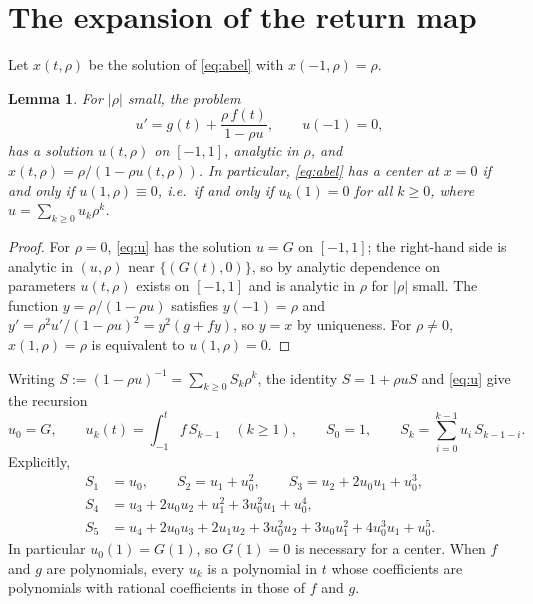 \documentclass[11pt]{amsart}
\numberwithin{equation}{section}
\theoremstyle{plain}
\newtheorem{lemma}[theorem]{Lemma}
\theoremstyle{definition}
\theoremstyle{remark}
\begin{document}
\section{The expansion of the return map}\label{sec:expansion}

Let $x(t,\rho)$ be the solution of \eqref{eq:abel} with $x(-1,\rho)=\rho$.

\begin{lemma}\label{lem:u}
For $|\rho|$ small, the problem
\begin{equation}\label{eq:u}
 u'=g(t)+\frac{\rho\,f(t)}{1-\rho u},\qquad u(-1)=0,
\end{equation}
has a solution $u(t,\rho)$ on $[-1,1]$, analytic in $\rho$, and
$x(t,\rho)=\rho/(1-\rho u(t,\rho))$. In particular, \eqref{eq:abel} has a center
at $x=0$ if and only if $u(1,\rho)\equiv0$, i.e.\ if and only if $u_k(1)=0$ for
all $k\ge0$, where $u=\sum_{k\ge0}u_k\rho^k$.
\end{lemma}

\begin{proof}
For $\rho=0$, \eqref{eq:u} has the solution $u=G$ on $[-1,1]$; the right-hand side
is analytic in $(u,\rho)$ near $\{(G(t),0)\}$, so by analytic dependence on
parameters $u(t,\rho)$ exists on $[-1,1]$ and is analytic in $\rho$ for $|\rho|$
small. The function $y=\rho/(1-\rho u)$ satisfies $y(-1)=\rho$ and
$y'=\rho^2u'/(1-\rho u)^2=y^2(g+fy)$, so $y=x$ by uniqueness. For $\rho\ne0$,
$x(1,\rho)=\rho$ is equivalent to $u(1,\rho)=0$.
\end{proof}

Writing $S:=(1-\rho u)^{-1}=\sum_{k\ge0}S_k\rho^k$, the identity $S=1+\rho uS$ and
\eqref{eq:u} give the recursion
\begin{equation}\label{eq:rec}
 u_0=G,\qquad u_k(t)=\int_{-1}^t f\,S_{k-1}\quad(k\ge1),\qquad
 S_0=1,\qquad S_k=\sum_{i=0}^{k-1}u_i\,S_{k-1-i}.
\end{equation}
Explicitly,
\begin{align*}
 S_1&=u_0,\qquad S_2=u_1+u_0^2,\qquad S_3=u_2+2u_0u_1+u_0^3,\\
 S_4&=u_3+2u_0u_2+u_1^2+3u_0^2u_1+u_0^4,\\
 S_5&=u_4+2u_0u_3+2u_1u_2+3u_0^2u_2+3u_0u_1^2+4u_0^3u_1+u_0^5.
\end{align*}
In particular $u_0(1)=G(1)$, so $G(1)=0$ is necessary for a center. When $f$ and
$g$ are polynomials, every $u_k$ is a polynomial in $t$ whose coefficients are
polynomials with rational coefficients in those of $f$ and $g$.
\end{document}
